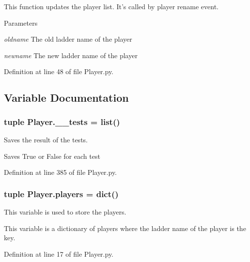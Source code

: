 This function updates the player list. It's called by player rename event. 
\begin{DoxyParams}{Parameters}
\item[{\em oldname}]The old ladder name of the player \item[{\em newname}]The new ladder name of the player \end{DoxyParams}


Definition at line 48 of file Player.py.



\subsection{Variable Documentation}
\hypertarget{namespace_player_a977b33b1d2c2e558d3d5160ee25ee788}{
\subsubsection[{\_\-\_\-tests}]{\setlength{\rightskip}{0pt plus 5cm}tuple {\bf Player.\_\-\_\-tests} = list()}}
\label{namespace_player_a977b33b1d2c2e558d3d5160ee25ee788}


Saves the result of the tests. 

Saves True or False for each test 

Definition at line 385 of file Player.py.

\hypertarget{namespace_player_a1a4b55c172677536d879fb397d3ef15e}{
\subsubsection[{players}]{\setlength{\rightskip}{0pt plus 5cm}tuple {\bf Player.players} = dict()}}
\label{namespace_player_a1a4b55c172677536d879fb397d3ef15e}


This variable is used to store the players. 

This variable is a dictionary of players where the ladder name of the player is the key. 

Definition at line 17 of file Player.py.

